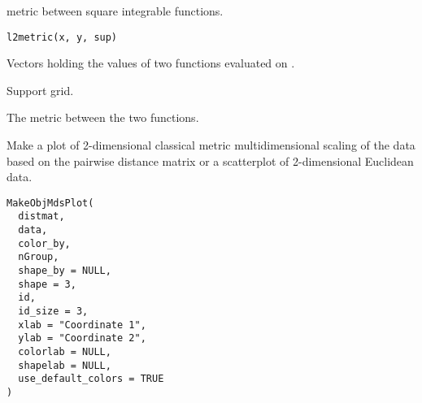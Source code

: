 \documentclass[a4paper]{book}
\begin{document}
%
\begin{Description}\relax
{} metric between square integrable functions.
\end{Description}
%
\begin{Usage}
\begin{verbatim}
l2metric(x, y, sup)
\end{verbatim}
\end{Usage}
%
\begin{Arguments}
\begin{ldescription}
\item[\code{x, y}] Vectors holding the values of two functions evaluated on .

\item[\code{sup}] Support grid.
\end{ldescription}
\end{Arguments}
%
\begin{Value}
The  metric between the two functions.
\end{Value}
%
\begin{Description}\relax
Make a plot of 2-dimensional classical metric multidimensional scaling of the 
data based on the pairwise distance matrix or a scatterplot of 2-dimensional Euclidean data.
\end{Description}
%
\begin{Usage}
\begin{verbatim}
MakeObjMdsPlot(
  distmat,
  data,
  color_by,
  nGroup,
  shape_by = NULL,
  shape = 3,
  id,
  id_size = 3,
  xlab = "Coordinate 1",
  ylab = "Coordinate 2",
  colorlab = NULL,
  shapelab = NULL,
  use_default_colors = TRUE
)
\end{verbatim}
\end{Usage}
%
\end{document}
